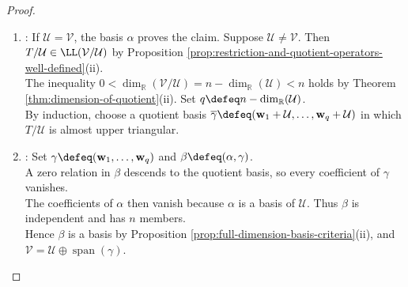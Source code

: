 \begin{theorem}
\begin{proof}
\begin{enumerate}[label=(\roman*)]
\begin{enumerate}[label=(\alph*)]
\item Suppose $b\neq0$. Implication $\mathbf{u}=\mathbf{0}\Rightarrow b\mathbf{v}=\mathbf{0}\Rightarrow\mathbf{v}=\mathbf{0}$ contradicts chosen eigenvector by first component identity.\\
Hence $\mathbf{u}\neq\mathbf{0}$. If $\mathbf{v}=c\mathbf{u}$ for $c\in\mathbb{R}$, then $c(a-bc)\mathbf{u}=cT\mathbf{u}=T\mathbf{v}=(b+ac)\mathbf{u}$ by linearity and the component identities.\\
Thus $b(c^2+1)=0$ by $\mathbf{u}\neq\mathbf{0}$, contrary to $b\neq0$. Therefore $\mathbf{u},\mathbf{v}$ are independent. Set $\mathcal{U}\defeq\operatorname{span}(\mathbf{u},\mathbf{v})$ and $\alpha\defeq(\mathbf{u},-\mathbf{v})$.\\
Then $\mathcal{U}\in\operatorname{Inv}(T)$ and $[T|_{\mathcal{U}}]_{\alpha\leftarrow\alpha}=\left[\begin{smallmatrix}a&-b\\b&a\end{smallmatrix}\right]$ by the component identities.
\end{enumerate}
In both cases, $\alpha$ is a basis of $\mathcal{U}$, $\dim(\mathcal{U})\in\{1,2\}$, and $[T|_{\mathcal{U}}]_{\alpha\leftarrow\alpha}$ is an admissible first diagonal block.
\item {}: If $\mathcal{U}=\mathcal{V}$, the basis $\alpha$ proves the claim. Suppose $\mathcal{U}\neq\mathcal{V}$. Then $T/\mathcal{U}\in\LL(\mathcal{V}/\mathcal{U})$ by Proposition \ref{prop:restriction-and-quotient-operators-well-defined}(ii).\\
The inequality $0<\dim_{\mathbb{R}}(\mathcal{V}/\mathcal{U})=n-\dim_{\mathbb{R}}(\mathcal{U})<n$ holds by Theorem \ref{thm:dimension-of-quotient}(ii). Set $q\defeq n-\dim_{\mathbb{R}}(\mathcal{U})$.\\
By induction, choose a quotient basis $\overline{\gamma}\defeq(\mathbf{w}_1+\mathcal{U},\ldots,\mathbf{w}_q+\mathcal{U})$ in which $T/\mathcal{U}$ is almost upper triangular.
\item {}: Set $\gamma\defeq(\mathbf{w}_1,\ldots,\mathbf{w}_q)$ and $\beta\defeq(\alpha,\gamma)$.\\
A zero relation in $\beta$ descends to the quotient basis, so every coefficient of $\gamma$ vanishes.\\
The coefficients of $\alpha$ then vanish because $\alpha$ is a basis of $\mathcal{U}$. Thus $\beta$ is independent and has $n$ members.\\
Hence $\beta$ is a basis by Proposition \ref{prop:full-dimension-basis-criteria}(ii), and $\mathcal{V}=\mathcal{U}\oplus\operatorname{span}(\gamma)$.\\

\end{enumerate}
\end{proof}
\end{theorem}
